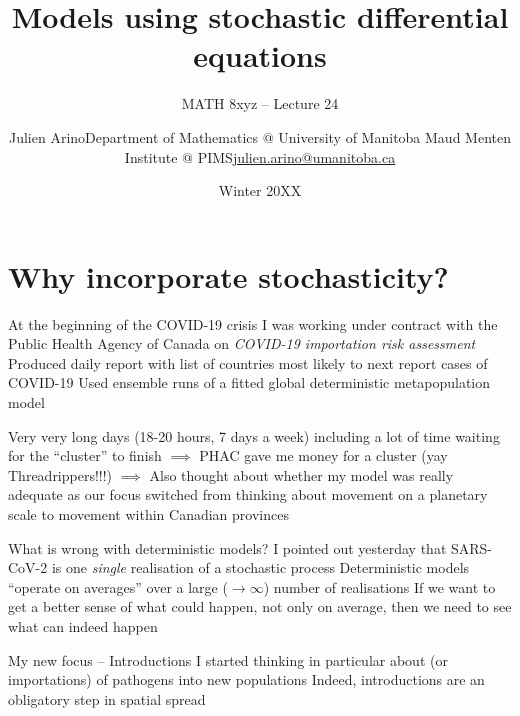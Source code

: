 \documentclass[aspectratio=169]{beamer}\usepackage[]{graphicx}\usepackage[]{xcolor}
\subtitle{MATH 8xyz -- Lecture 24}
\author{\texorpdfstring{Julien Arino\newline Department of Mathematics @ University of Manitoba \newline Maud Menten Institute @ PIMS\newline\url{julien.arino@umanitoba.ca}}{Julien Arino}}
\date{Winter 20XX}
\title{Models using stochastic differential equations}
\begin{document}


\section{Why incorporate stochasticity?}

\begin{frame}{At the beginning of the COVID-19 crisis}
\bbullet 
I was working under contract with the Public Health Agency of Canada on \emph{COVID-19 importation risk assessment}
\vfill
\bbullet 
Produced daily report with list of countries most likely to next report cases of COVID-19
\vfill
\bbullet
Used ensemble runs of a fitted global deterministic metapopulation model
\end{frame}


\begin{frame}
\bbullet Very very long days (18-20 hours, 7 days a week)
\vfill
\bbullet including a lot of time waiting for the ``cluster'' to finish
\vfill
$\implies$ PHAC gave me money for a cluster (yay Threadrippers!!!)
\vfill
$\implies$ Also thought about whether my model was really adequate as our focus switched from thinking about movement on a planetary scale to movement within Canadian provinces
\end{frame}

\begin{frame}{What is wrong with deterministic models?}
\bbullet I pointed out yesterday that SARS-CoV-2 is one \emph{single} realisation of a stochastic process
\vfill
\bbullet Deterministic models ``operate on averages'' over a large ($\to\infty$) number of realisations
\vfill
\bbullet If we want to get a better sense of what could happen, not only on average, then we need to see what can indeed happen
\end{frame}

\begin{frame}{My new focus -- Introductions}
\bbullet I started thinking in particular about  (or importations) of pathogens into new populations
\vfill
\bbullet Indeed, introductions are an obligatory step in spatial spread
\end{frame}
\end{document}
